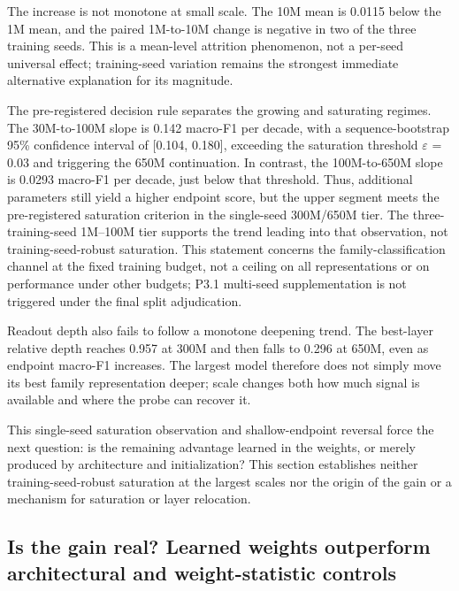 The increase is not monotone at small scale. The 10M mean is 0.0115 below the 1M mean, and the paired 1M-to-10M change is negative in two of the three training seeds. This is a mean-level attrition phenomenon, not a per-seed universal effect; training-seed variation remains the strongest immediate alternative explanation for its magnitude.

The pre-registered decision rule separates the growing and saturating regimes. The 30M-to-100M slope is 0.142 macro-F1 per decade, with a sequence-bootstrap 95\% confidence interval of {[}0.104, 0.180{]}, exceeding the saturation threshold \(\varepsilon\) = 0.03 and triggering the 650M continuation. In contrast, the 100M-to-650M slope is 0.0293 macro-F1 per decade, just below that threshold. Thus, additional parameters still yield a higher endpoint score, but the upper segment meets the pre-registered saturation criterion in the single-seed 300M/650M tier. The three-training-seed 1M--100M tier supports the trend leading into that observation, not training-seed-robust saturation. This statement concerns the family-classification channel at the fixed training budget, not a ceiling on all representations or on performance under other budgets; P3.1 multi-seed supplementation is not triggered under the final split adjudication.

Readout depth also fails to follow a monotone deepening trend. The best-layer relative depth reaches 0.957 at 300M and then falls to 0.296 at 650M, even as endpoint macro-F1 increases. The largest model therefore does not simply move its best family representation deeper; scale changes both how much signal is available and where the probe can recover it.

This single-seed saturation observation and shallow-endpoint reversal force the next question: is the remaining advantage learned in the weights, or merely produced by architecture and initialization? This section establishes neither training-seed-robust saturation at the largest scales nor the origin of the gain or a mechanism for saturation or layer relocation.

\hypertarget{is-the-gain-real-learned-weights-outperform-architectural-and-weight-statistic-controls}{%
\subsection{Is the gain real? Learned weights outperform architectural and weight-statistic controls}\label{is-the-gain-real-learned-weights-outperform-architectural-and-weight-statistic-controls}}

